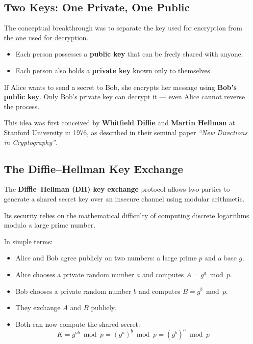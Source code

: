\subsection{Two Keys: One Private, One Public}

The conceptual breakthrough was to separate the key used for encryption from the one used for decryption.

\begin{itemize}
  \item Each person possesses a \textbf{public key} that can be freely shared with anyone.
  \item Each person also holds a \textbf{private key} known only to themselves.
\end{itemize}

If Alice wants to send a secret to Bob, she encrypts her message using \textbf{Bob’s public key}.  
Only Bob’s private key can decrypt it — even Alice cannot reverse the process.

This idea was first conceived by \textbf{Whitfield Diffie} and \textbf{Martin Hellman} at Stanford University in 1976, as described in their seminal paper \emph{“New Directions in Cryptography”}.

\subsection{The Diffie–Hellman Key Exchange}

The \textbf{Diffie–Hellman (DH) key exchange} protocol allows two parties to generate a shared secret key over an insecure channel using modular arithmetic.

Its security relies on the mathematical difficulty of computing discrete logarithms modulo a large prime number.

In simple terms:
\begin{itemize}
  \item Alice and Bob agree publicly on two numbers: a large prime $p$ and a base $g$.
  \item Alice chooses a private random number $a$ and computes $A = g^a \bmod p$.
  \item Bob chooses a private random number $b$ and computes $B = g^b \bmod p$.
  \item They exchange $A$ and $B$ publicly.
  \item Both can now compute the shared secret:
  \[
  K = g^{ab} \bmod p = (g^a)^b \bmod p = (g^b)^a \bmod p
  \]
\end{itemize}


